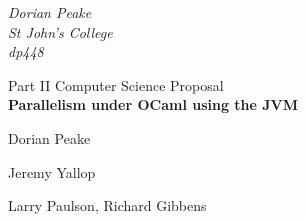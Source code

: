\begin{titlepage}

\begin{flushright}
{\large \emph{Dorian Peake\\
      St John's College\\
      dp448}}
\end{flushright}

\vspace{3cm}

\begin{center}
{\LARGE Part II Computer Science Proposal}\\[1cm]
{\LARGE \bfseries Parallelism under OCaml using the JVM}\\[0.5cm]

\vspace{3cm}

\begin{description}
{\large
\item[Project Originator:]Dorian Peake\\[1cm]
\item[Project Supervisor:]Jeremy Yallop\\[1cm]
\item[Project Overseers:]Larry Paulson, Richard Gibbens\\[1cm]
}
\end{description}
\end{center}
\end{titlepage}
